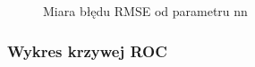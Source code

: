 \documentclass[12pt, a4paper]{article}
\begin{document}
\begin{figure}[H]
  \begin{center}
  \end{center}
  \caption{Miara błędu RMSE od parametru nn}
  \label{fig:ubcf-nn-rmse}
\end{figure}

\subsubsection{Wykres krzywej ROC}
\end{document}
